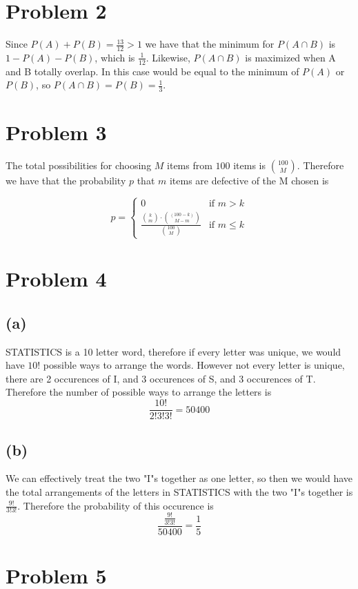 \section*{Problem 2}
Since $P(A)+P(B)=\frac{13}{12}>1$ we have that the minimum for $P(A\cap B)$ is $1-P(A)-P(B)$, which is $\frac{1}{12}$. Likewise, $P(A\cap B)$ is maximized when A and B totally overlap. In this case
would be equal to the minimum of $P(A)$ or $P(B)$, so $P(A\cap B)=P(B)=\frac{1}{3}$.
\section*{Problem 3}
The total possibilities for choosing $M$ items from $100$ items is $100\choose M$. Therefore we have that
the probability $p$ that $m$ items are defective of the M chosen is 

$$p=\begin{cases}
    0 & \text{if } m>k\\
    \frac{{k\choose m}\cdot {(100-k)\choose M-m}}{{100\choose M}} & \text{if } m\leq k
\end{cases}$$
\section*{Problem 4}
\subsection*{(a)}
STATISTICS is a 10 letter word, therefore if every letter was unique, we would have
$10!$ possible ways to arrange the words. However not every letter is unique, there are 2 occurences of I, and
3 occurences of S, and 3 occurences of T. Therefore the number of possible ways to arrange the letters is 
$$\frac{10!}{2!3!3!}=\boxed{50400}$$
\subsection*{(b)}
We can effectively treat the two "I"s together as one letter, so then we would
have the total arrangements of the letters in STATISTICS with the two "I"s together 
is $\frac{9!}{3!3!}$. Therefore the probability of this occurence is 
$$\frac{\frac{9!}{3!3!}}{50400}=\boxed{\frac{1}{5}}$$
\section*{Problem 5}
